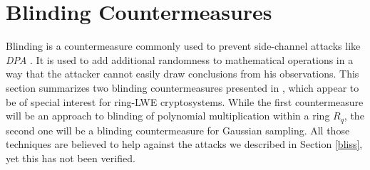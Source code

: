 \chapter{Blinding Countermeasures}
Blinding is a countermeasure commonly used to prevent side-channel attacks like \textit{\ac{DPA}} \cite{DBLP:conf/crypto/KocherJJ99}. It is used to add additional randomness to mathematical operations in a way that the attacker cannot easily draw conclusions from his observations. This section summarizes two blinding countermeasures presented in \cite{cryptoeprint:2016:276}, which appear to be of special interest for \ac{ring-LWE} cryptosystems. While the first countermeasure will be an approach to blinding of polynomial multiplication within a ring \(R_q\), the second one will be a blinding countermeasure for Gaussian sampling. All those techniques are believed to help against the attacks we described in Section \ref{bliss}, yet this has not been verified.

